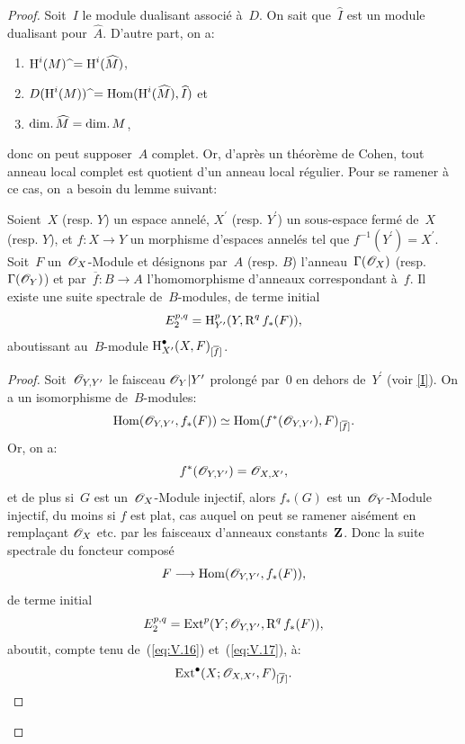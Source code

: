 \begin{proof}
Soit~$I$ le module dualisant associ\'e \`a~$D$. On sait que~$\widehat{I}$ est un module dualisant pour~$\widehat{A}$. D'autre part, on a:
\begin{enumerate}
\item[] $\operatorname{H}^{i}(M)\;\widehat{\hbox{}}=\operatorname{H}^{i}(\widehat{M})$,
\item[] $D(\operatorname{H}^{i}(M))\;\widehat{\hbox{}}=\operatorname{Hom}(\operatorname{H}^{i}(\widehat{M}), \widehat{I})$ et
\item[] $\mathrm{dim}.\,\widehat{M}=\mathrm{dim}.\, M$,
\end{enumerate}
\noindent
donc on peut supposer~$A$ complet. Or, d'apr\`es un th\'eor\`eme de Cohen, tout anneau local complet est quotient d'un anneau local r\'egulier. Pour se ramener \`a ce cas, on~a besoin du lemme suivant:

\begin{lemme} \label{V.3.2}
Soient~$X$ (resp. $Y$) un espace annel\'e, $X^{\prime}$ (resp. $Y^{\prime}$) un sous-espace ferm\'e de~$X$ (resp. $Y$), et $f\colon X\to Y$ un morphisme d'espaces annel\'es tel que $f^{-1}(Y^{\prime})=X^{\prime}$. Soit~$F$ un~$\mathscr{O}_X$-Module et d\'esignons par~$A$ (resp. $B$) l'anneau~$\Gamma(\mathscr{O}_X)$ (resp. $\Gamma({\mathscr O}_{Y})$) et par~$\overline{f}\colon B\to A$ l'homomorphisme d'anneaux correspondant \`a~$f$. Il existe une suite spectrale de~$B$-modules, de terme initial
\begin{equation} \label{eq:V.15} E_{2}^{p, q}=\operatorname{H}_{Y^{\prime}}^{p}(Y, \operatorname{R}^{q}f_{\ast}(F)),
\end{equation}
aboutissant au~$B$-module $\operatorname{H}_{X^{\prime}}^{\bullet}(X, F)_{[\overline{f}]}$.
\end{lemme}

\begin{proof}
Soit~${\mathscr O}_{Y, Y^{\prime}}$ le faisceau ${{\mathscr O}_{Y}}{|Y^{\prime}}$ prolong\'e par~$0$ en dehors de~$Y^{\prime}$ (voir \Exp \ref{I}). On a un isomorphisme de~$B$-modules:
\begin{equation} \label{eq:V.16} \operatorname{Hom}({\mathscr O}_{Y, Y^{\prime}}, f_{\ast}(F))\simeq\operatorname{Hom}(f^{\ast}({\mathscr O}_{Y, Y^{\prime}}), F)_{[\overline{f}]}.
\end{equation}
Or, on a:
\begin{equation} \label{eq:V.17} f^{\ast}({\mathscr O}_{Y, Y^{\prime}})={\mathscr O}_{X, X^{\prime}},
\end{equation}
et de plus si~$G$ est un~$\mathscr{O}_X$-Module injectif, alors
$f_{\ast}(G)$ est un~${\mathscr O}_{Y}$-Module injectif, du moins si $f$
est plat, cas auquel on peut se ramener ais\'ement en rempla\c cant
$\mathscr{O}_X$ etc. par les faisceaux d'anneaux constants~$\mathbf{Z}$. Donc la
suite spectrale du foncteur compos\'e
$$F\to\Hom(\Oo_{Y, Y^{\prime}}, f_{\ast}(F)),
$$
de terme initial
$$E_{2}^{p, q}=\operatorname{Ext}^{p}(Y;{\mathscr O}_{Y, Y^{\prime}}, \operatorname{R}^{q}f_{\ast}(F)),
$$
aboutit, compte tenu de~(\ref{eq:V.16}) et~(\ref{eq:V.17}), \`a:
$$
\operatorname{Ext}^{\bullet}(X;{\mathscr O}_{X, X^{\prime}}, F)_{[\overline{f}]}.
$$


\end{proof}
\end{proof}
